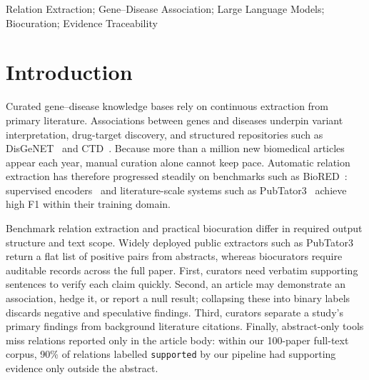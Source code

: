 \documentclass[preprint,10pt,letterpaper]{elsarticle}
\newcommand{\st}[1]{\texttt{#1}}             %
\begin{document}
\begin{frontmatter}
\begin{abstract}
\textbf{Conclusion:} Our pipeline yields precise, syntactically grounded gene--disease extractions that complement supervised tools. Lower recall relative to in-domain classifiers suggests that conservative evidence and entity-scope criteria contribute to the recall gap, a trade-off that users can adjust deterministically at scoring time via the status reason codes.
\end{abstract}

\begin{keyword}
Relation Extraction; Gene--Disease Association; Large Language Models; Biocuration; Evidence Traceability
\end{keyword}

\end{frontmatter}

\section{Introduction}

Curated gene--disease knowledge bases rely on continuous extraction from primary literature. Associations between genes and diseases underpin variant interpretation, drug-target discovery, and structured repositories such as DisGeNET~\cite{pinero2020disgenet} and CTD~\cite{davis2023ctd}. Because more than a million new biomedical articles appear each year, manual curation alone cannot keep pace. Automatic relation extraction has therefore progressed steadily on benchmarks such as BioRED~\cite{luo2022biored}: supervised encoders~\cite{lee2020biobert,gu2021pubmedbert,lai2023biorex} and literature-scale systems such as PubTator3~\cite{wei2024pubtator3} achieve high F1 within their training domain.

Benchmark relation extraction and practical biocuration differ in required output structure and text scope. Widely deployed public extractors such as PubTator3~\cite{wei2024pubtator3} return a flat list of positive pairs from abstracts, whereas biocurators require auditable records across the full paper. First, curators need verbatim supporting sentences to verify each claim quickly. Second, an article may demonstrate an association, hedge it, or report a null result; collapsing these into binary labels discards negative and speculative findings. Third, curators separate a study's primary findings from background literature citations. Finally, abstract-only tools miss relations reported only in the article body: within our 100-paper full-text corpus, 90\% of relations labelled \st{supported} by our pipeline had supporting evidence only outside the abstract.
\end{document}
